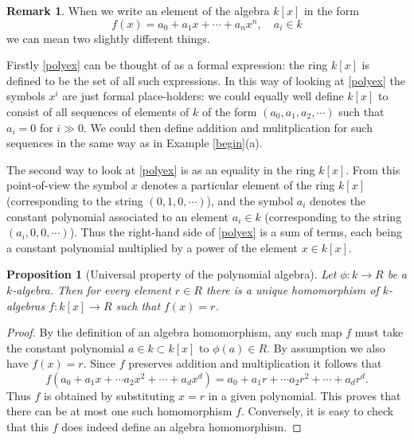 \documentclass [12pt,oneside,a4paper,mathscr]{amsart}
\newtheorem{prop}[thm]{Proposition}
\theoremstyle{definition}
\newtheorem{remark}[thm]{Remark}
\begin{document}
\begin{remark}
When we write an element of the algebra $k[x]$ in the form
\begin{equation}
\label{polyex}f(x)=a_0 + a_1 x+ \cdots + a_n x^n, \quad a_i\in k\end{equation}
we can mean two slightly different things.

Firstly \eqref{polyex} can be thought of as a formal expression: the ring $k[x]$ is defined to be the set of all such expressions. In this way of looking at \eqref{polyex} the symbols $x^i$ are just formal
 place-holders: we could equally well define $k[x]$ to consist of all sequences of elements of $k$ of the form  $(a_0,a_1,a_2,\cdots )$  such that $a_i=0$ for $i\gg 0$. We could then define addition and mulitplication for such sequences in the same way as in Example \ref{begin}(a).

The second way to look at \eqref{polyex} is as an equality in the ring $k[x]$. From this point-of-view the symbol $x$ denotes a particular element of the ring $k[x]$ (corresponding to the string $(0,1,0,\cdots )$), and the symbol $a_i$ denotes the constant polynomial associated to an element $a_i\in k$  (corresponding to the string $(a_i,0,0,\cdots)$).   Thus the right-hand side of \eqref{polyex} is a sum of terms, each being a constant polynomial multiplied by a power of the element $x\in k[x]$. 
\end{remark}


\begin{prop}[Universal property of the polynomial algebra]
\label{uni}
Let $\phi\colon k\to R$ be a $k$-algebra. Then for every element $r\in R$ there is a unique homomorphism of $k$-algebras $f\colon k[x]\to R$ such that $f(x)=r$.
\end{prop}

\begin{proof}
By the definition of an algebra homomorphism, any such map $f$ must take the constant polynomial $a\in k\subset k[x]$ to $\phi(a)\in R$. By assumption we also have $f(x)=r$. Since $f$ preserves addition and multiplication it follows that 
\[f(a_0+a_1 x+ \cdots a_2 x^2 +\cdots + a_d x^d)=a_0+a_1 r+ \cdots a_2 r^2 +\cdots + a_d r^d.\]
Thus $f$ is obtained by substituting $x=r$ in a given polynomial.
This proves that there can be at most one such homomorphism $f$. Conversely, it is easy to check that this $f$ does indeed define an algebra homomorphism.
\end{proof}
\end{document}
